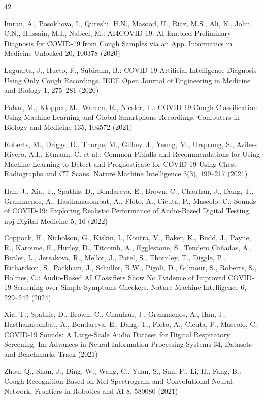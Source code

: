 \begin{thebibliography}{42}

Imran, A., Posokhova, I., Qureshi, H.N., Masood, U., Riaz, M.S., Ali, K., John, C.N., Hussain, M.I., Nabeel, M.: AI4COVID-19: AI Enabled Preliminary Diagnosis for COVID-19 from Cough Samples via an App. Informatics in Medicine Unlocked 20, 100378 (2020)

Laguarta, J., Hueto, F., Subirana, B.: COVID-19 Artificial Intelligence Diagnosis Using Only Cough Recordings. IEEE Open Journal of Engineering in Medicine and Biology 1, 275–281 (2020)

Pahar, M., Klopper, M., Warren, R., Niesler, T.: COVID-19 Cough Classification Using Machine Learning and Global Smartphone Recordings. Computers in Biology and Medicine 135, 104572 (2021)

Roberts, M., Driggs, D., Thorpe, M., Gilbey, J., Yeung, M., Ursprung, S., Aviles-Rivero, A.I., Etmann, C. et al.: Common Pitfalls and Recommendations for Using Machine Learning to Detect and Prognosticate for COVID-19 Using Chest Radiographs and CT Scans. Nature Machine Intelligence 3(3), 199–217 (2021)

Han, J., Xia, T., Spathis, D., Bondareva, E., Brown, C., Chauhan, J., Dang, T., Grammenos, A., Hasthanasombat, A., Floto, A., Cicuta, P., Mascolo, C.: Sounds of COVID-19: Exploring Realistic Performance of Audio-Based Digital Testing. npj Digital Medicine 5, 16 (2022)

Coppock, H., Nicholson, G., Kiskin, I., Koutra, V., Baker, K., Budd, J., Payne, R., Karoune, E., Hurley, D., Titcomb, A., Egglestone, S., Tendero Ca{\~n}adas, A., Butler, L., Jersakova, R., Mellor, J., Patel, S., Thornley, T., Diggle, P., Richardson, S., Packham, J., Schuller, B.W., Pigoli, D., Gilmour, S., Roberts, S., Holmes, C.: Audio-Based AI Classifiers Show No Evidence of Improved COVID-19 Screening over Simple Symptoms Checkers. Nature Machine Intelligence 6, 229–242 (2024)

Xia, T., Spathis, D., Brown, C., Chauhan, J., Grammenos, A., Han, J., Hasthanasombat, A., Bondareva, E., Dang, T., Floto, A., Cicuta, P., Mascolo, C.: COVID-19 Sounds: A Large-Scale Audio Dataset for Digital Respiratory Screening. In: Advances in Neural Information Processing Systems 34, Datasets and Benchmarks Track (2021)

Zhou, Q., Shan, J., Ding, W., Wang, C., Yuan, S., Sun, F., Li, H., Fang, B.: Cough Recognition Based on Mel-Spectrogram and Convolutional Neural Network. Frontiers in Robotics and AI 8, 580080 (2021)


\end{thebibliography}
